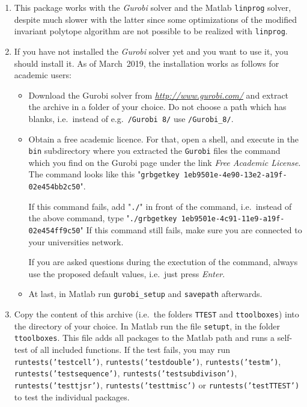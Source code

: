 \begin{enumerate}

\item This package works with the \emph{Gurobi} solver and the Matlab \verb|linprog| solver, despite much slower with the latter since some optimizations of the modified invariant polytope algorithm are not possible to be realized with \verb|linprog|.

\item If you have not installed the \emph{Gurobi} solver yet and you want to use it, 
you should install it.
As of March~2019, the installation works as follows for academic users:
\begin{itemize}\label{install_gurobi}
    \item Download the Gurobi solver from 
    \href{http://www.gurobi.com/}{{\itshape http://www.gurobi.com/}} and
    extract the archive in a folder of your choice. 
    Do not choose a path which has blanks, i.e.\ instead of e.g.\ \texttt{/Gurobi 8/} use \texttt{/Gurobi\_8/}.
    
    \item Obtain a free academic licence. For that, open a shell, and execute in the
    \texttt{bin} subdirectory where you extracted the \texttt{Gurobi} files 
    the command which you find on the Gurobi page under the link 
    \emph{Free Academic License}. 
    The command looks like this 
    "\texttt{grbgetkey 1eb9501e-4e90-13e2-a19f-02e454bb2c50}".
    
    If this command fails, add "\texttt{./}" in front of the command, 
    i.e.\ instead of the above command, type 
    "\texttt{./grbgetkey 1eb9501e-4c91-11e9-a19f-02e454ff9c50}"
    If this command still fails, make sure you are connected to your universities network.
    
    If you are asked questions during the exectution of the command, always use the proposed default values, i.e.\ just press \emph{Enter}.
    
    \item At last, in Matlab run \verb|gurobi_setup| and \verb|savepath| afterwards.
        
\end{itemize}

\item \label{install_copy}
Copy the content of this archive 
(i.e.\ the folders \verb|TTEST| and \verb|ttoolboxes|)
into the directory of your choice.
In Matlab run the file \verb|setupt|, in the folder \texttt{ttoolboxes}.
This file adds all packages to the Matlab path and runs a self-test of all included functions.
If the test fails, you may run 
\texttt{runtests('testcell')},
\texttt{runtests('testdouble')},
\texttt{runtests('testm')},
\texttt{runtests('testsequence')},
\texttt{\justify runtests('testsubdivison')},
\texttt{runtests('testtjsr')},
\texttt{runtests('testtmisc')} or
\texttt{runtests('testTTEST')}
to test the individual packages.
\end{enumerate}

